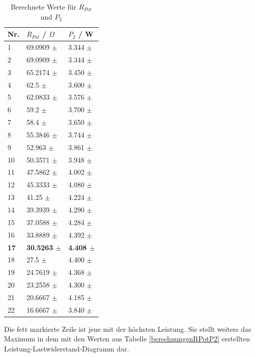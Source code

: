 \documentclass[12pt,a4paper,twoside]{article}
\begin{document}
\begin{table}[H]
    \centering
    \caption{Berechnete Werte für $R_{Pot}$ und $P_{2}$}
    \label{tab:berechnungenRPotP2}
    \begin{tabular}{| l | l | l |}
        \hline
        Nr.  & $R_{Pot}$ / $\Omega$ & $P_{2}$ / W \\
        \hline
        1 & 69.0909 $\pm$  & 3.344 $\pm$  \\
        2 & 69.0909 $\pm$  & 3.344 $\pm$  \\
        3 & 65.2174 $\pm$  & 3.450 $\pm$  \\
        4 & 62.5 $\pm$  & 3.600 $\pm$  \\
        5 & 62.0833 $\pm$  & 3.576 $\pm$  \\
        6 & 59.2 $\pm$  & 3.700 $\pm$  \\
        7 & 58.4 $\pm$  & 3.650 $\pm$  \\
        8 & 55.3846 $\pm$  & 3.744 $\pm$  \\
        9 & 52.963 $\pm$  & 3.861 $\pm$  \\
        10 & 50.3571 $\pm$  & 3.948 $\pm$  \\
        11 & 47.5862 $\pm$  & 4.002 $\pm$  \\
        12 & 45.3333 $\pm$  & 4.080 $\pm$  \\
        13 & 41.25 $\pm$  & 4.224 $\pm$  \\
        14 & 39.3939 $\pm$  & 4.290 $\pm$  \\
        15 & 37.0588 $\pm$  & 4.284 $\pm$  \\
        16 & 33.8889 $\pm$  & 4.392 $\pm$  \\
        \textbf{17} & \textbf{30.5263 $\pm$ } & \textbf{4.408 $\pm$ } \\
        18 & 27.5 $\pm$  & 4.400 $\pm$  \\
        19 & 24.7619 $\pm$  & 4.368 $\pm$  \\
        20 & 23.2558 $\pm$  & 4.300 $\pm$  \\
        21 & 20.6667 $\pm$  & 4.185 $\pm$  \\
        22 & 16.6667 $\pm$  & 3.840 $\pm$  \\
        \hline
    \end{tabular}
\end{table}

\noindent
Die fett markierte Zeile ist jene mit der höchsten Leistung. Sie stellt weiters das Maximum in dem mit den Werten aus Tabelle \ref{berechnungenRPotP2} erstellten Leistung-Lastwiderstand-Diagramm dar.
\end{document}
